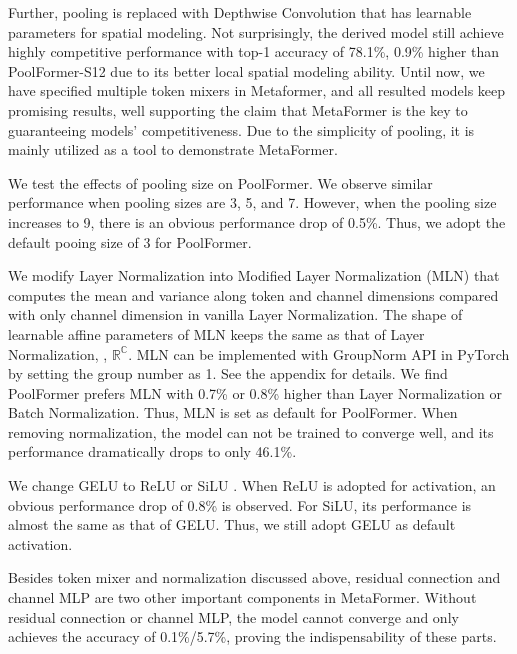 Further, pooling is replaced with Depthwise Convolution \cite{chollet2017xception, mamalet2012simplifying} that has learnable parameters for spatial modeling. Not surprisingly, the derived model still achieve highly competitive performance with top-1 accuracy of 78.1\%, 0.9\% higher than PoolFormer-S12 due to its better local spatial modeling ability. Until now, we have specified multiple token mixers in Metaformer, and all resulted models keep promising results, well supporting the claim that MetaFormer is the key to guaranteeing models' competitiveness. Due to the simplicity of pooling, it is mainly utilized as a tool to demonstrate MetaFormer.


We test the effects of pooling size on PoolFormer. We observe similar performance when pooling sizes are 3,  5, and 7. However, when the pooling size increases to 9, there is an obvious performance drop of 0.5\%.  Thus, we adopt the default pooing size of 3 for PoolFormer. 


 We modify Layer Normalization \cite{layer_norm} into Modified Layer Normalization (MLN) that computes the mean and variance along token and channel dimensions compared with only channel dimension in vanilla Layer Normalization. The shape of learnable affine parameters of MLN keeps the same as that of Layer Normalization, \ie, $\mathbb{R^C}$. MLN can be implemented with GroupNorm API in PyTorch by setting the group number as 1. See the appendix for details. We find PoolFormer prefers MLN with 0.7\% or 0.8\% higher than Layer Normalization or Batch Normalization. Thus, MLN is set as default for PoolFormer. When removing normalization, the model can not be trained to converge well, and its performance dramatically drops to only 46.1\%.


 We change GELU \cite{gelu} to ReLU \cite{relu} or SiLU \cite{silu}. When ReLU is adopted for activation, an obvious performance drop of 0.8\% is observed. For SiLU, its performance is almost the same as that of GELU. Thus, we still adopt GELU as default activation. 


 Besides token mixer and normalization discussed above, residual connection \cite{resnet} and channel MLP \cite{rosenblatt1961principles, rumelhart1985learning} are two other important components in MetaFormer. Without residual connection or channel MLP, the model cannot converge and only achieves the accuracy of 0.1\%/5.7\%, proving the indispensability of these parts.


